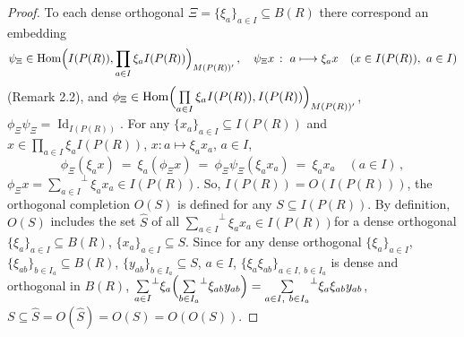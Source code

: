 \documentclass[a4paper,11pt]{article}
\DeclareMathOperator{\Id}{Id}
\DeclareMathOperator{\Hom}{Hom}
\begin{document}
\begin{proof} To each dense orthogonal 
${\Xi=\{\xi_a\}_{a\in I}\subseteq B(R)}$ there correspond an embedding 
\[
\psi_{\Xi}\in 
\Hom\Bigl(I(P(R)), \prod\limits_{a\in I} \xi_a I(P(R))\Bigr)_{M(P(R))'}\,,\quad
\psi_{\Xi} x\,:\ a\longmapsto \xi_a x\quad 
(x\in I(P(R)),\ a\in I) 
\]
(Remark 2.2), and ${\phi_{\Xi}\in 
\Hom\Bigl(\prod\limits_{a\in I} \xi_a I(P(R)), I(P(R))\Bigr)_{M(P(R))'}}$, 
${\phi_{\Xi} \psi_{\Xi}=\Id_{I(P(R))}}$. For any 
${\{x_a\}_{a\in I}\subseteq I(P(R))}$ and 
${x\in \prod\limits_{a\in I} \xi_a I(P(R))}$, 
${x: a\longmapsto \xi_a x_a}$, ${a\in I}$, 
\[
\phi_{\Xi} (\xi_a x)\ =\ \xi_a (\phi_{\Xi} x)\ =\ 
\phi_{\Xi} \psi_{\Xi}(\xi_a x_a)\ =\ \xi_a x_a\quad (a\in I)\,,
\]
${\phi_{\Xi} x={\sum\limits_{a\in I}}^{\perp} \xi_a x_a\in I(P(R))}$. So,  
${I(P(R))=O(I(P(R)))}$, the orthogonal completion $O(S)$ is defined for 
any ${S\subseteq I(P(R))}$. By definition, $O(S)$ includes the set $\hat{S}$ 
of all ${{\sum\limits_{a\in I}}^{\perp} \xi_a x_a\in I(P(R))}$\linebreak for 
a dense orthogonal 
${\{\xi_a\}_{a\in I}\subseteq B(R)}$, ${\{x_a\}_{a\in I}\subseteq S}$. 
Since for any dense orthogonal 
$\{\xi_a\}_{a\in I}$, ${\{\xi_{a b}\}_{b\in I_a}\subseteq B(R)}$, 
${\{y_{a b}\}_{b\in I_a}\subseteq S}$, ${a\in I}$, 
${\{\xi_a \xi_{a b}\}_{a\in I,\ b\in I_a}}$ is dense and orthogonal in $B(R)$, 
${{\sum\limits_{a\in I}}^{\perp} \xi_a
\Bigl({\sum\limits_{b\in I_a}}^{\perp} \xi_{a b} y_{a b}\Bigr)=
{\sum\limits_{a\in I,\ b\in I_a}}^{\perp} \xi_a \xi_{a b} y_{a b}}$, 
${S\subseteq \hat{S}=O(\hat{S})=O(S)=O(O(S))}$.


\end{proof}
\end{document}
